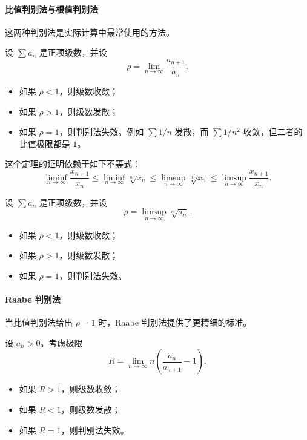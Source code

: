 \paragraph{比值判别法与根值判别法}

这两种判别法是实际计算中最常使用的方法。

\newpage

\begin{theorem}
设 $\sum a_n$ 是正项级数，并设
\[
    \rho=\lim_{n\to\infty}\frac{a_{n+1}}{a_n}.
\]
\begin{itemize}
    \item 如果 $\rho<1$，则级数收敛；
    \item 如果 $\rho>1$，则级数发散；
    \item 如果 $\rho=1$，则判别法失效。例如 $\sum 1/n$ 发散，而 $\sum 1/n^2$ 收敛，但二者的比值极限都是 $1$。
\end{itemize}
\end{theorem}

这个定理的证明依赖于如下不等式：
\[
\liminf_{n\to\infty}\frac{x_{n+1}}{x_n}
\leq \liminf_{n\to\infty}\sqrt[n]{x_n}
\leq \limsup_{n\to\infty}\sqrt[n]{x_n}
\leq \limsup_{n\to\infty}\frac{x_{n+1}}{x_n}.
\]

\begin{theorem}
设 $\sum a_n$ 是正项级数，并设
\[
    \rho=\limsup_{n\to\infty}\sqrt[n]{a_n}.
\]
\begin{itemize}
    \item 如果 $\rho<1$，则级数收敛；
    \item 如果 $\rho>1$，则级数发散；
    \item 如果 $\rho=1$，则判别法失效。
\end{itemize}
\end{theorem}

\paragraph{Raabe 判别法}

当比值判别法给出 $\rho=1$ 时，Raabe 判别法提供了更精细的标准。

\begin{theorem}
设 $a_n>0$。考虑极限
\[
    R=\lim_{n\to\infty}n\left(\frac{a_n}{a_{n+1}}-1\right).
\]
\begin{itemize}
    \item 如果 $R>1$，则级数收敛；
    \item 如果 $R<1$，则级数发散；
    \item 如果 $R=1$，则判别法失效。
\end{itemize}
\end{theorem}

